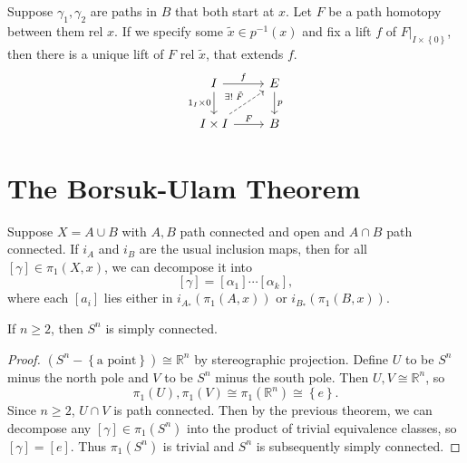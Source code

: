 \documentclass[twoside,10pt]{report}
\begin{document}
\begin{cor}
	Suppose $\gamma_1,\gamma_2$ are paths in $B$ that both start at $x$. Let $F$ be a path homotopy between them rel $x$. If we specify some $\tilde{x} \in p^{-1}(x)$ and fix a lift $f$ of $F|_{I \times \left\{ 0 \right\}}$, then there is a unique lift of $F$ rel $\tilde{x}$, that extends $f$.
	\[
	\begin{tikzcd}
		I\arrow[d,"1_{I}\times 0"']\rar{f}&E\dar{p}\\
		I\times I\rar{F}\arrow[ur,dashed,"\exists ! \; \tilde{F}"]&B
	\end{tikzcd}
	\] 
\end{cor}


\section{The Borsuk-Ulam Theorem}

\begin{thrm}[]
	Suppose $X=A \cup B$ with $A,B$ path connected and open and $A \cap B$ path connected. If $i_{A}$ and $i_{B}$ are the usual inclusion maps, then for all $[\gamma] \in \pi_1(X,x)$, we can decompose it into
	\[
		[\gamma] = [\alpha_1] \cdots [\alpha_{k}],
	\] where each $[a_i]$ lies either in $i_{A_*}(\pi_1(A,x))$ or $i_{B_{*}}(\pi_1(B,x))$.
\end{thrm}

\begin{cor}
If $n \geq 2$, then $S^{n}$ is simply connected.
\end{cor}
\begin{proof}
	$(S^{n}-\left\{ \text{a point} \right\}) \cong \mathbb{R}^{n}$ by stereographic projection. Define $U$ to be $S^{n}$ minus the north pole and $V$ to be $S^{n}$ minus the south pole. Then $U,V \cong \mathbb{R}^{n}$, so
	\[
		\pi_1(U), \pi_1(V) \cong \pi_1(\mathbb{R}^{n}) \cong \left\{ e \right\}.
	\] Since $n \geq 2$, $U \cap V$ is path connected. Then by the previous theorem, we can decompose any $[\gamma] \in \pi_1(S^{n})$ into the product of trivial equivalence classes, so $[\gamma]=[e]$. Thus $\pi_1(S^{n})$ is trivial and $S^{n}$ is subsequently simply connected.
\end{proof}
\end{document}
